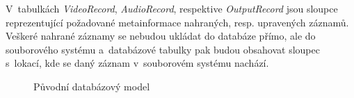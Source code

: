 \documentclass[thesis=M,czech]{FITthesis}[2012/06/26]
\begin{document}
V~tabulkách \textit{VideoRecord}, \textit{AudioRecord}, respektive \textit{OutputRecord} jsou sloupce reprezentující požadované metainformace nahraných, resp. upravených záznamů. Veškeré nahrané záznamy se nebudou ukládat do databáze přímo, ale do souborového systému a~databázové tabulky pak budou obsahovat sloupec s~lokací, kde se daný záznam v~souborovém systému nachází.

\begin{figure}\centering
	\caption{Původní databázový model}\label{img:navrh_backend_db_orig}
\end{figure}
\end{document}
